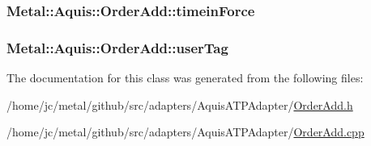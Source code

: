 \subsubsection[{timein\+Force}]{ Metal\+::\+Aquis\+::\+Order\+Add\+::timein\+Force}\label{classMetal_1_1Aquis_1_1OrderAdd_aee9ffdefdcf5f575c2c1228627e89430}
\hypertarget{classMetal_1_1Aquis_1_1OrderAdd_ac81fd314fe475edf236c36f47764cc72}{}
\subsubsection[{user\+Tag}]{ Metal\+::\+Aquis\+::\+Order\+Add\+::user\+Tag}\label{classMetal_1_1Aquis_1_1OrderAdd_ac81fd314fe475edf236c36f47764cc72}


The documentation for this class was generated from the following files\+:\begin{DoxyCompactItemize}
\item 
/home/jc/metal/github/src/adapters/\+Aquis\+A\+T\+P\+Adapter/\hyperlink{OrderAdd_8h}{Order\+Add.\+h}\item 
/home/jc/metal/github/src/adapters/\+Aquis\+A\+T\+P\+Adapter/\hyperlink{OrderAdd_8cpp}{Order\+Add.\+cpp}\end{DoxyCompactItemize}
